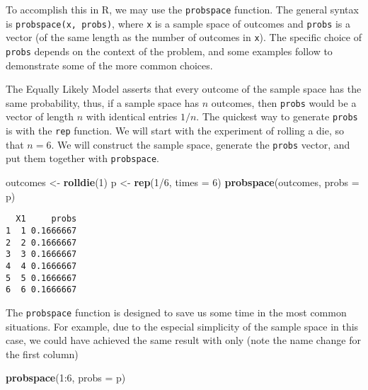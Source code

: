 \documentclass[]{book}
\newenvironment{Shaded}{\begin{snugshade}}{\end{snugshade}}
\newcommand{\KeywordTok}[1]{\textcolor[rgb]{0.13,0.29,0.53}{\textbf{{#1}}}}
\newcommand{\DataTypeTok}[1]{\textcolor[rgb]{0.13,0.29,0.53}{{#1}}}
\newcommand{\DecValTok}[1]{\textcolor[rgb]{0.00,0.00,0.81}{{#1}}}
\newcommand{\StringTok}[1]{\textcolor[rgb]{0.31,0.60,0.02}{{#1}}}
\newcommand{\NormalTok}[1]{{#1}}
\numberwithin{equation}{chapter}
\numberwithin{figure}{chapter}
\theoremstyle{plain}
\theoremstyle{definition}
\theoremstyle{remark}
\theoremstyle{definition}
\theoremstyle{definition}
\theoremstyle{remark}
\let\BeginKnitrBlock\begin \let\EndKnitrBlock\end
\begin{document}
To accomplish this in R, we may use the \texttt{probspace} function. The
general syntax is \texttt{probspace(x,\ probs)}, where \texttt{x} is a
sample space of outcomes and \texttt{probs} is a vector (of the same
length as the number of outcomes in \texttt{x}). The specific choice of
\texttt{probs} depends on the context of the problem, and some examples
follow to demonstrate some of the more common choices.

\bigskip

\BeginKnitrBlock{example}
\protect\hypertarget{ex:unnamed-chunk-116}{}{\label{ex:unnamed-chunk-116}}The
Equally Likely Model asserts that every outcome of the sample space has
the same probability, thus, if a sample space has \(n\) outcomes, then
\texttt{probs} would be a vector of length \(n\) with identical entries
\(1/n\). The quickest way to generate \texttt{probs} is with the
\texttt{rep} function. We will start with the experiment of rolling a
die, so that \(n=6\). We will construct the sample space, generate the
\texttt{probs} vector, and put them together with \texttt{probspace}.
\EndKnitrBlock{example}

\begin{Shaded}
\begin{Highlighting}[]
\NormalTok{outcomes <-}\StringTok{ }\KeywordTok{rolldie}\NormalTok{(}\DecValTok{1}\NormalTok{) }
\NormalTok{p <-}\StringTok{ }\KeywordTok{rep}\NormalTok{(}\DecValTok{1}\NormalTok{/}\DecValTok{6}\NormalTok{, }\DataTypeTok{times =} \DecValTok{6}\NormalTok{) }
\KeywordTok{probspace}\NormalTok{(outcomes, }\DataTypeTok{probs =} \NormalTok{p) }
\end{Highlighting}
\end{Shaded}

\begin{verbatim}
  X1     probs
1  1 0.1666667
2  2 0.1666667
3  3 0.1666667
4  4 0.1666667
5  5 0.1666667
6  6 0.1666667
\end{verbatim}

The \texttt{probspace} function is designed to save us some time in the
most common situations. For example, due to the especial simplicity of
the sample space in this case, we could have achieved the same result
with only (note the name change for the first column)

\begin{Shaded}
\begin{Highlighting}[]
\KeywordTok{probspace}\NormalTok{(}\DecValTok{1}\NormalTok{:}\DecValTok{6}\NormalTok{, }\DataTypeTok{probs =} \NormalTok{p) }
\end{Highlighting}
\end{Shaded}
\end{document}
